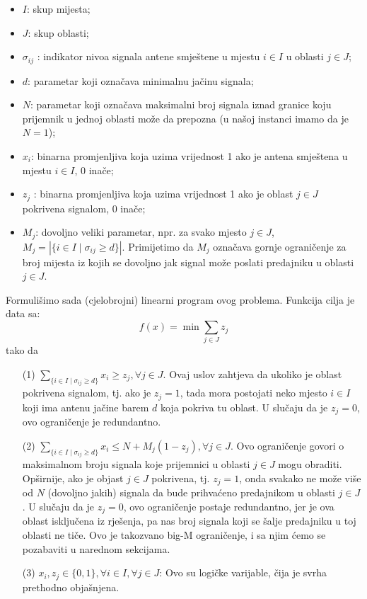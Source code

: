 \documentclass[a4paper, utf8, 11pt, colorlinks]{book}
\theoremstyle{definition}
\begin{document}
\begin{itemize}
	\item $I$: skup mijesta;
	\item $J$: skup oblasti;
	\item $\sigma_{ij}$ : indikator nivoa signala antene   smještene u mjestu $i \in I$ u oblasti $j \in J$;
	\item $d$: parametar koji označava minimalnu jačinu signala;
	\item $N$: parametar koji označava maksimalni broj signala iznad granice koju prijemnik u jednoj oblasti može da prepozna (u našoj instanci imamo da je $N=1$);
	\item $x_i$: binarna promjenljiva koja uzima vrijednost 1 ako je antena smještena u mjestu $i\in I$, 0 inače;
	\item  $z_j$ : binarna promjenljiva koja uzima vrijednost 1 ako je oblast $j \in J$ pokrivena signalom, 0 inače;
	\item $M_j$: dovoljno veliki parametar, npr. za svako mjesto $j \in J$, $M_j= |\{ i \in I \mid \sigma_{ij} \geq d\}|$. Primijetimo da $M_j$ označava gornje ograničenje za broj mijesta iz kojih se dovoljno jak signal može poslati predajniku u oblasti $j\in J$. 
\end{itemize}
Formulišimo sada (cjelobrojni) linearni program ovog problema. 
Funkcija cilja je data sa:
$$ f(x) = \min \sum_{j \in J} z_j $$
tako da
\begin{enumerate}
	\item[(1)]  $ \sum_{\{i \in I \mid \sigma_{ij} \geq d \}} x_i \geq z_j, \forall j \in J $. Ovaj uslov zahtjeva da   ukoliko je oblast pokrivena signalom, tj. ako je $z_j = 1$, tada mora postojati neko mjesto $i \in I$ koji ima antenu jačine barem $d$ koja pokriva tu oblast. U slučaju da je $z_j=0$, ovo ograničenje je redundantno. 
	
	\item[(2)] $ \sum_{\{i \in I \mid \sigma_{ij} \geq d \}} x_i  \leq N + M_j( 1 - z_j), \forall j \in J $. Ovo ograničenje govori o maksimalnom broju signala koje prijemnici u oblasti $j\in J$ mogu obraditi. Opširnije, ako je objast $j\in J$ pokrivena, tj. $z_j=1$, onda   svakako ne može više od $N$ (dovoljno jakih) signala da bude prihvaćeno predajnikom u oblasti $j \in J$. U slučaju da je $z_j = 0$, ovo ograničenje postaje redundantno, jer je ova oblast isključena iz rješenja, pa nas broj signala koji se šalje predajniku u toj oblasti ne tiče. Ovo je takozvano big-M ograničenje, i sa njim ćemo se pozabaviti u narednom sekcijama. 
	  
	\item[(3)] $x_i, z_j \in\{0, 1\}, \forall i \in I, \forall j \in J$: Ovo su logičke varijable, čija je svrha prethodno objašnjena. 
\end{enumerate}
\end{document}
